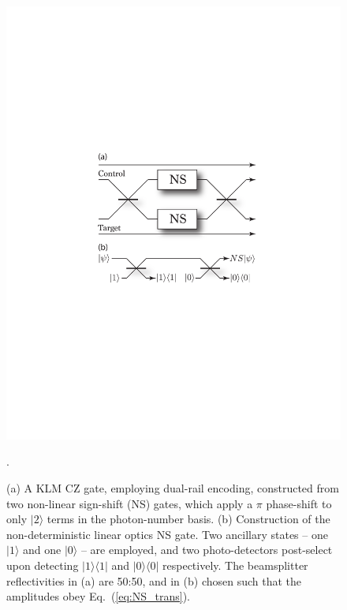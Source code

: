 \documentclass[aps, rmp, twocolumn, amsmath, amssymb, nofootinbib, superscriptaddress, longbibliography, floatfix, table-of-contents, eqsecnum]{revtex4-1}
\newcommand{\bra}[1]{\langle#1|}
\newcommand{\ket}[1]{|#1\rangle}
\begin{document}
\begin{figure}[!htb]
\includegraphics[width=0.8\columnwidth]{KLM_gate}
\caption{(a) A KLM CZ gate, employing dual-rail encoding, constructed from two non-linear sign-shift (NS) gates, which apply a $\pi$ phase-shift to only $\ket{2}$ terms in the photon-number basis. (b) Construction of the non-deterministic linear optics NS gate. Two ancillary states -- one $\ket{1}$ and one $\ket{0}$ -- are employed, and two photo-detectors post-select upon detecting $\ket{1}\bra{1}$ and $\ket{0}\bra{0}$ respectively. The beamsplitter reflectivities in (a) are 50:50, and in (b) chosen such that the amplitudes obey Eq.~(\ref{eq:NS_trans}).}. \label{fig:KLM_gate} 
\end{figure}
\end{document}
